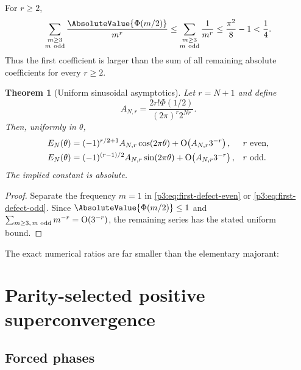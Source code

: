 \documentclass[11pt,oneside]{article}
\numberwithin{equation}{section}
\newtheorem{theorem}{Theorem}[section]
\theoremstyle{definition}
\theoremstyle{remark}
\begin{document}
For $r\ge2$,
\begin{equation}
 \sum_{\substack{m\ge3\\m\ \mathrm{odd}}}
 \frac{\AbsoluteValue{\Phi(m/2)}}{m^r}
 \le\sum_{\substack{m\ge3\\m\ \mathrm{odd}}}\frac1{m^r}
 \le\frac{\pi^2}{8}-1<\frac14.
 \label{p3:eq:harmonic-tail-bound}
\end{equation}
Thus the first coefficient is larger than the sum of all remaining absolute coefficients for every $r\ge2$.

\begin{theorem}[Uniform sinusoidal asymptotics]
\label{p3:thm:sinusoidal-asymptotics}
Let $r=N+1$ and define
\begin{equation}
 A_{N,r}=\frac{2r!\Phi(1/2)}{(2\pi)^r2^{Nr}}.
 \label{p3:eq:first-harmonic-amplitude}
\end{equation}
Then, uniformly in $\theta$,
\begin{align}
 E_N(\theta)
 &=(-1)^{r/2+1}A_{N,r}\cos(2\pi\theta)
 +\mathrm O\!\left(A_{N,r}3^{-r}\right),&&r\ \text{even},
 \label{p3:eq:cos-asymptotic}\\
 E_N(\theta)
 &=(-1)^{(r-1)/2}A_{N,r}\sin(2\pi\theta)
 +\mathrm O\!\left(A_{N,r}3^{-r}\right),&&r\ \text{odd}.
 \label{p3:eq:sin-asymptotic}
\end{align}
The implied constant is absolute.
\end{theorem}

\begin{proof}
Separate the frequency $m=1$ in \eqref{p3:eq:first-defect-even} or \eqref{p3:eq:first-defect-odd}.  Since $\AbsoluteValue{\Phi(m/2)}\le1$ and
$\sum_{m\ge3,\,m\text{ odd}}m^{-r}=\mathrm O(3^{-r})$, the remaining series has the stated uniform bound.
\end{proof}

The exact numerical ratios are far smaller than the elementary majorant:
\begin{table}[H]
\centering
\caption{Absolute spectral tail divided by the first harmonic.}
\label{p3:tab:harmonic-tail}

\end{table}

\section{Parity-selected positive superconvergence}
\label{p3:sec:superconvergence}

\subsection{Forced phases}
\end{document}
